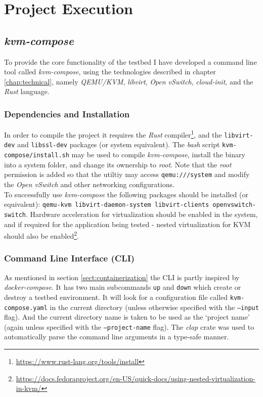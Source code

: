 \documentclass[
    author={Jacob Daniel Halsey},
    supervisor={Prof. Awais Rashid},
    degree={BSc},
    title={Building a Testbed for Evaluating Privacy Enhancing Technologies  (PETs)},
    subtitle={},
    type={software development},
    year={2021}
]{dissertation}
\begin{document}
\chapter{Project Execution}
\label{chap:execution}

\section{\emph{kvm-compose}}

To provide the core functionality of the testbed I have developed a command line tool called \emph{kvm-compose},
using the technologies described in chapter \ref{chap:technical}, namely \emph{QEMU/KVM}, 
\emph{libvirt}, \emph{Open vSwitch}, \emph{cloud-init}, and the \emph{Rust} language.

\subsection{Dependencies and Installation}
\label{sect:dependencies}

In order to compile the project it requires the \emph{Rust} compiler\footnote{\url{https://www.rust-lang.org/tools/install}},
and the \texttt{libvirt-dev} and \texttt{libssl-dev} packages (or system equivalent).
The \emph{bash} script \texttt{kvm-compose/install.sh} may be used to compile \emph{kvm-compose},
install the binary into a system folder, and change its ownership to \emph{root}.
Note that the \emph{root} permission is added so that the utiltiy may access \texttt{qemu:///system}
and modify the \emph{Open vSwitch} and other networking configurations. \\

To successfully use \emph{kvm-compose} the following packages should be installed (or equivalent):
\texttt{qemu-kvm libvirt-daemon-system libvirt-clients openvswitch-switch}. Hardware acceleration
for virtualization should be enabled in the system, and if required for the application being tested - 
nested virtualization for KVM should also be 
enabled\footnote{\url{https://docs.fedoraproject.org/en-US/quick-docs/using-nested-virtualization-in-kvm/}}.

\subsection{Command Line Interface (CLI)}

As mentioned in section \ref{sect:containerization} the CLI is partly inspired by \emph{docker-compose}.
It has two main subcommands \texttt{up} and \texttt{down} which create or destroy a testbed environment.
It will look for a configuration file called \texttt{kvm-compose.yaml} in the current directory (unless
otherwise specified with the \texttt{--input} flag).
And the current directory name is taken to be used as the `project name' (again unless specified with
the \texttt{--project-name} flag). The \emph{clap} crate was used to automatically parse the command line arguments
in a type-safe manner. \\ 
\end{document}
